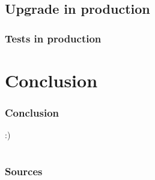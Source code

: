 \documentclass[11pt,compress]{beamer}
\begin{document}
\subsection{Upgrade in production}
\begin{frame}
\frametitle{Tests in production}
\end{frame}

\section{Conclusion}
\begin{frame}
\frametitle{Conclusion}
:)
\end{frame}

\section*{}
\begin{frame}
\frametitle{Sources}

\end{frame}
\end{document}
